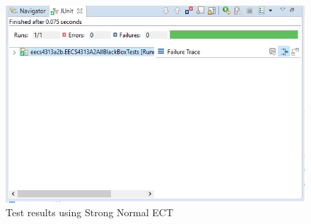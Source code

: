 \documentclass[fontsize=12pt,paper=letter,twoside]{scrartcl}
\begin{document}
\newpage
\begin{figure}[!htb]
\begin{center}
\includegraphics[width=.99\textwidth]{images/bbt/bbt_ect.png}
\end{center}
\caption{Test results using Strong Normal ECT}
\label{fig:bbt_ect}
\end{figure}

\newpage
\end{document}

